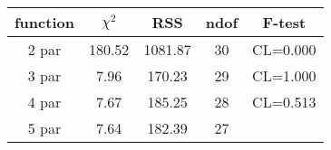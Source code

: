 \begin{tabular}{c|c|c|c|c}
function & $\chi^2$ & RSS & ndof & F-test \\
\hline
2 par & 180.52 & 1081.87 & 30 & CL=0.000 \\
3 par & 7.96 & 170.23 & 29 & CL=1.000 \\
4 par & 7.67 & 185.25 & 28 & CL=0.513 \\
5 par & 7.64 & 182.39 & 27 & \\
\hline
\end{tabular}
